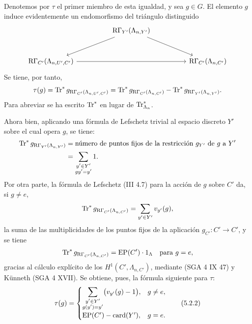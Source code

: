 Denotemos por $\tau$ el primer miembro de esta igualdad, y sea $g\in G$. El elemento $g$ induce evidentemente un endomorfismo del triángulo distinguido
\[
\begin{tikzcd}[column sep=huge,row sep=large]
& \RG_{Y'}(\Lambda_{n,Y'}) \arrow[dl] \arrow[dr] & \\
\RG_{C'}(\Lambda_{n,U',C'}) \arrow[rr] && \RG_{C'}(\Lambda_{n,C'})
\end{tikzcd}
\]
Se tiene, por tanto,
\[
\tau(g)=\operatorname{Tr}^*g_{\mathrm R\Gamma_{C'}(\Lambda_{n,U',C'})}
=\operatorname{Tr}^*g_{\mathrm R\Gamma_{C'}(\Lambda_{n,C'})}
-\operatorname{Tr}^*g_{\mathrm R\Gamma_{Y'}(\Lambda_{n,Y'})}.
\]
Para abreviar se ha escrito $\operatorname{Tr}^*$ en lugar de $\operatorname{Tr}^*_{\Lambda_n}$.

Ahora bien, aplicando una fórmula de Lefschetz trivial al espacio discreto $Y'$ sobre el cual opera $g$, se tiene:
\[
\begin{aligned}
\operatorname{Tr}^*g_{\mathrm R\Gamma_{Y'}(\Lambda_{n,Y'})}
&=\text{número de puntos fijos de la restricción } g_{Y'} \text{ de } g \text{ a } Y'\\
&=\sum_{\substack{y'\in Y'\\gy'=y'}}1.
\end{aligned}
\]
Por otra parte, la fórmula de Lefschetz (III 4.7) para la acción de $g$ sobre $C'$ da, si $g\ne e$,
\[
\operatorname{Tr}^*g_{\mathrm R\Gamma_{C'}(\Lambda_{n,C'})}
=
\sum_{y'\in Y'} v_{y'}(g),
\]
la suma de las multiplicidades de los puntos fijos de la aplicación $g_{C'}:C'\to C'$, y se tiene
\[
\operatorname{Tr}^*g_{\mathrm R\Gamma_{C'}(\Lambda_{n,C'})}=\operatorname{EP}(C')\cdot1_\Lambda
\quad\text{para }g=e,
\]
gracias al cálculo explícito de los $H^1(C',\Lambda_{n,C'})$, mediante (SGA 4 IX 47) y Künneth (SGA 4 XVII). Se obtiene, pues, la fórmula siguiente para $\tau$:
\[
\tau(g)=
\begin{cases}
\displaystyle\sum_{\substack{y'\in Y'\\g(y')=y'}}\bigl(v_{y'}(g)-1\bigr),& g\ne e,\\[0.8em]
\operatorname{EP}(C')-\operatorname{card}(Y'),& g=e.
\end{cases}
\tag{5.2.2}
\]
